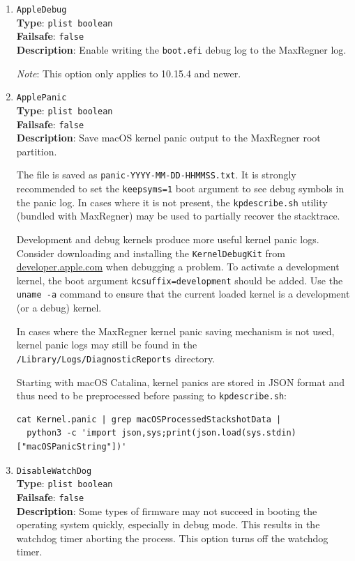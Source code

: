 \documentclass[]{article}
\begin{document}
\begin{enumerate}

\item
  \texttt{AppleDebug}\\
  \textbf{Type}: \texttt{plist\ boolean}\\
  \textbf{Failsafe}: \texttt{false}\\
  \textbf{Description}: Enable writing the \texttt{boot.efi} debug log to the MaxRegner log.

  \emph{Note}: This option only applies to 10.15.4 and newer.

\item
  \texttt{ApplePanic}\\
  \textbf{Type}: \texttt{plist\ boolean}\\
  \textbf{Failsafe}: \texttt{false}\\
  \textbf{Description}: Save macOS kernel panic output to the MaxRegner root partition.

  The file is saved as \texttt{panic-YYYY-MM-DD-HHMMSS.txt}. It is strongly
  recommended to set the \texttt{keepsyms=1} boot argument to see debug symbols
  in the panic log. In cases where it is not present, the \texttt{kpdescribe.sh}
  utility (bundled with MaxRegner) may be used to partially recover the stacktrace.

  Development and debug kernels produce more useful kernel panic logs.
  Consider downloading and installing the \texttt{KernelDebugKit} from
  \href{https://developer.apple.com}{developer.apple.com} when debugging a problem.
  To activate a development kernel, the boot argument \texttt{kcsuffix=development} should be added.
  Use the \texttt{uname -a} command to ensure that the current loaded
  kernel is a development (or a debug) kernel.

  In cases where the MaxRegner kernel panic saving mechanism is not used, kernel panic
  logs may still be found in the \texttt{/Library/Logs/DiagnosticReports} directory.

  Starting with macOS Catalina, kernel panics are stored in JSON format and thus
  need to be preprocessed before passing to \texttt{kpdescribe.sh}:

\begin{lstlisting}[label=kpanic, style=ocbash]
cat Kernel.panic | grep macOSProcessedStackshotData |
  python3 -c 'import json,sys;print(json.load(sys.stdin)["macOSPanicString"])'
\end{lstlisting}

\item
  \texttt{DisableWatchDog}\\
  \textbf{Type}: \texttt{plist\ boolean}\\
  \textbf{Failsafe}: \texttt{false}\\
  \textbf{Description}: Some types of firmware may not succeed in booting
  the operating system quickly, especially in debug mode. This results in the
  watchdog timer aborting the process. This option turns off the watchdog timer.


\end{enumerate}
\end{document}
